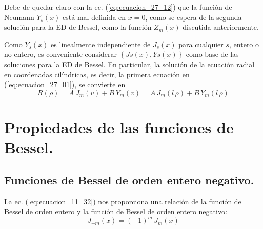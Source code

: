 Debe de quedar claro con la ec. (\ref{eq:ecuacion_27_12}) que la función de Neumann $Y_{s} (x)$ está mal definida en $x = 0$, como se espera de la segunda solución para la ED de Bessel, como la función $Z_{m} (x)$ discutida anteriormente.
\par
Como $Y_{s} (x)$ es linealmente independiente de $J_{s} (x)$ para cualquier $s$, entero o no entero, es conveniente considerar $\left\{ Js (x), Ys (x) \right\}$ como base de las soluciones para la ED de Bessel. En particular, la solución de la ecuación radial en coordenadas cilíndricas, es decir, la primera ecuación en (\ref{eq:ecuacion_27_01}), se convierte en
\begin{equation}
R(\rho) = A \, J_{m}(v) + B \, Y_{m}(v) = A \, J_{m} (l \, \rho) + B \, Y_{m} (l \, \rho)
\label{eq:ecuacion_27_13}
\end{equation}
\section{Propiedades de las funciones de Bessel.}
\subsection{Funciones de Bessel de orden entero negativo.}
La ec. (\ref{eq:ecuacion_11_32}) nos proporciona una relación de la función de Bessel de orden entero y la función de Bessel de orden entero negativo:
\begin{equation}
J_{-m} (x) = (-1)^{m} \, J_{m} (x)
\label{eq:ecuacion_27_14}
\end{equation}
